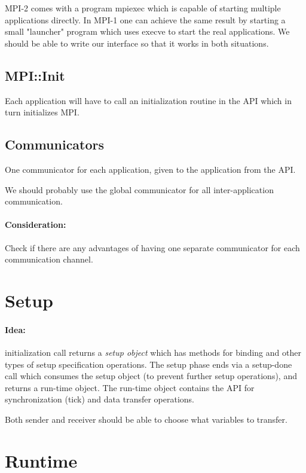 \documentclass[a4paper]{report}
\begin{document}
MPI-2 comes with a program mpiexec which is capable of starting
multiple applications directly.  In MPI-1 one can achieve the same
result by starting a small "launcher" program which uses execve to
start the real applications.  We should be able to write our interface
so that it works in both situations.


\subsection{MPI::Init}

Each application will have to call an initialization routine in the API
which in turn initializes MPI.


\subsection{Communicators}

One communicator for each application, given to the application from
the API.

We should probably use the global communicator for all
inter-application communication.

\paragraph{Consideration:} Check if there are any advantages of having one
separate communicator for each communication channel.


\section{Setup}

\paragraph{Idea:} initialization call returns a \emph{setup object}
which has methods for binding and other types of setup specification
operations.  The setup phase ends via a setup-done call which consumes
the setup object (to prevent further setup operations), and returns a
run-time object.  The run-time object contains the API for
synchronization (tick) and data transfer operations.

Both sender and receiver should be able to choose what variables to
transfer.


\section{Runtime}
\end{document}
